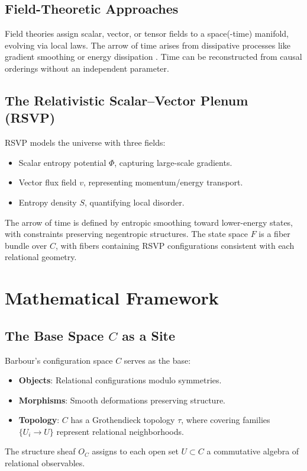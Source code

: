 \documentclass[11pt]{article}
\begin{document}
\subsection{Field-Theoretic Approaches}
Field theories assign scalar, vector, or tensor fields to a space(-time) manifold, evolving via local laws. The arrow of time arises from dissipative processes like gradient smoothing or energy dissipation \citep{Rovelli2004}. Time can be reconstructed from causal orderings without an independent parameter.

\subsection{The Relativistic Scalar–Vector Plenum (RSVP)}
RSVP models the universe with three fields:
\begin{itemize}
    \item Scalar entropy potential $\Phi$, capturing large-scale gradients.
    \item Vector flux field $v$, representing momentum/energy transport.
    \item Entropy density $S$, quantifying local disorder.
\end{itemize}
The arrow of time is defined by entropic smoothing toward lower-energy states, with constraints preserving negentropic structures. The state space $F$ is a fiber bundle over $C$, with fibers containing RSVP configurations consistent with each relational geometry.

\section{Mathematical Framework}

\subsection{The Base Space $C$ as a Site}
Barbour’s configuration space $C$ serves as the base:
\begin{itemize}
    \item \textbf{Objects}: Relational configurations modulo symmetries.
    \item \textbf{Morphisms}: Smooth deformations preserving structure.
    \item \textbf{Topology}: $C$ has a Grothendieck topology $\tau$, where covering families $\{U_i \to U\}$ represent relational neighborhoods.
\end{itemize}
The structure sheaf $O_C$ assigns to each open set $U \subset C$ a commutative algebra of relational observables.
\end{document}
